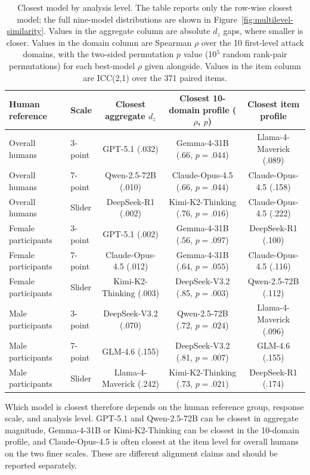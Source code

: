 \documentclass[a4paper,fleqn,review]{cas-sc}
\begin{document}
\begin{table}[t]
  \centering
  \scriptsize
  \setlength{\tabcolsep}{3.2pt}
  \begin{tabular}{llccc}
    \toprule
    Human reference & Scale & Closest aggregate $d_z$ & Closest 10-domain profile ($\rho$, $p$) & Closest item profile \\
    \midrule
    Overall humans & 3-point & GPT-5.1 (.032) & Gemma-4-31B (.66, $p=.044$) & Llama-4-Maverick (.089) \\
    Overall humans & 7-point & Qwen-2.5-72B (.010) & Claude-Opus-4.5 (.66, $p=.044$) & Claude-Opus-4.5 (.158) \\
    Overall humans & Slider & DeepSeek-R1 (.002) & Kimi-K2-Thinking (.76, $p=.016$) & Claude-Opus-4.5 (.222) \\
    Female participants & 3-point & GPT-5.1 (.002) & Gemma-4-31B (.56, $p=.097$) & DeepSeek-R1 (.100) \\
    Female participants & 7-point & Claude-Opus-4.5 (.012) & Gemma-4-31B (.64, $p=.055$) & Claude-Opus-4.5 (.116) \\
    Female participants & Slider & Kimi-K2-Thinking (.003) & DeepSeek-V3.2 (.85, $p=.003$) & Qwen-2.5-72B (.112) \\
    Male participants & 3-point & DeepSeek-V3.2 (.070) & Qwen-2.5-72B (.72, $p=.024$) & Llama-4-Maverick (.096) \\
    Male participants & 7-point & GLM-4.6 (.155) & DeepSeek-V3.2 (.81, $p=.007$) & GLM-4.6 (.155) \\
    Male participants & Slider & Llama-4-Maverick (.242) & Kimi-K2-Thinking (.73, $p=.021$) & DeepSeek-R1 (.174) \\
    \bottomrule
  \end{tabular}
  \caption{Closest model by analysis level. The table reports only the row-wise closest model; the full nine-model distributions are shown in Figure~\ref{fig:multilevel-similarity}. Values in the aggregate column are absolute $d_z$ gaps, where smaller is closer. Values in the domain column are Spearman $\rho$ over the 10 first-level attack domains, with the two-sided permutation $p$ value (10$^{5}$ random rank-pair permutations) for each best-model $\rho$ given alongside. Values in the item column are ICC(2,1) over the 371 paired items.}
  \label{tab:multilevel-top-models}
\end{table}

Which model is closest therefore depends on the human reference group, response scale, and analysis level. GPT-5.1 and Qwen-2.5-72B can be closest in aggregate magnitude, Gemma-4-31B or Kimi-K2-Thinking can be closest in the 10-domain profile, and Claude-Opus-4.5 is often closest at the item level for overall humans on the two finer scales. These are different alignment claims and should be reported separately.
\end{document}
